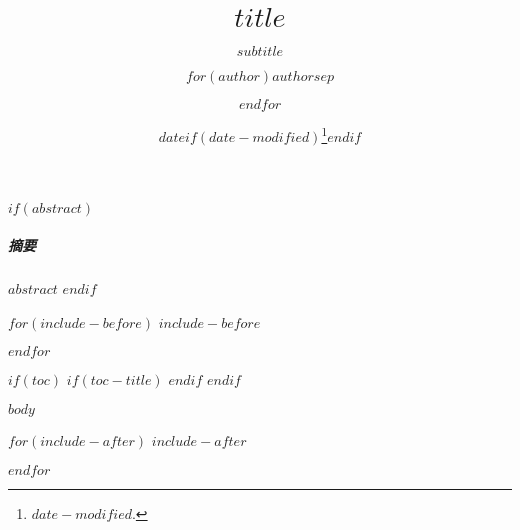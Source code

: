 \documentclass[fontset=fandol,$if(fontsize)$ $fontsize$,$endif$]{ctexart}
\title{$title$}
\subtitle{$subtitle$}
\author{$for(author)$$author$$sep$ \and $endfor$}
\date{$date$$if(date-modified)$\thanks{\transmodified \space $date-modified$.}$endif$}
\def\transtoc{目录}
\def\transtoc{Table of Contents}
\renewenvironment{abstract}{\subparagraph{摘要}\kaishu}{}
\theoremstyle{suncnthm}
\theoremstyle{definition}
\theoremstyle{remark}
\begin{document}
\maketitle

$if(abstract)$
\begin{abstract}
    $abstract$
\end{abstract}
$endif$

$for(include-before)$
$include-before$

$endfor$

$if(toc)$
$if(toc-title)$
\renewcommand*\contentsname{\transtoc}
$endif$
{
\setcounter{tocdepth}{$toc-depth$}
\tableofcontents
}
$endif$

$body$

\ifzh
  \printbibliography[title={参考文献}]
\else
  \printbibliography
\fi

$for(include-after)$
$include-after$

$endfor$
\end{document}
